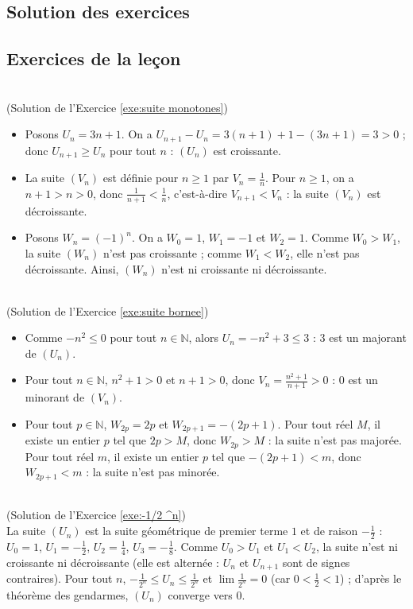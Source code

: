 \begin{corrige}
\section{Solution des exercices}
\subsection*{Exercices de la le\c{c}on}
\begin{sol} ~ \\
\label{Sol:suite monotones}
(Solution de l'Exercice \ref{exe:suite monotones})
\begin{itemize} 
\item Posons $U_n = 3 n + 1 $.
      On a $U_{n+1} - U_n = 3(n+1) + 1 - (3n + 1) = 3 > 0$ ; donc $U_{n+1} \geq U_n$ pour tout $n$ : $(U_n)$ est croissante.
\item La suite $(V_n)$ est d\'efinie pour $n \geq 1$ par $V_n = \frac{1}{n}$.
      Pour $n \geq 1$, on a $n + 1 > n > 0$, donc $\frac{1}{n+1} < \frac{1}{n}$, c'est-\`a-dire $V_{n+1} < V_n$ :
      la suite $(V_n)$ est d\'ecroissante.
\item Posons $W_n = (-1)^n$. On a $W_0 = 1$, $W_1 = -1$ et $W_2 = 1$.
      Comme $W_0 > W_1$, la suite $(W_n)$ n'est pas croissante ; comme $W_1 < W_2$, elle n'est pas d\'ecroissante.
      Ainsi, $(W_n)$ n'est ni croissante ni d\'ecroissante.
\end{itemize}
\end{sol}
%
\begin{sol} ~ \\
(Solution de l'Exercice \ref{exe:suite bornee})
\label{Sol:suite bornee}
\begin{itemize} 
\item Comme $-n^2 \leq 0$ pour tout $n \in \mathbb{N}$, alors $U_n = -n^2 + 3 \leq 3$ : $3$ est un majorant de $(U_n)$.
\item Pour tout $n \in \mathbb{N}$, $n^2 + 1 > 0$ et $n+1 > 0$, donc $V_n = \frac{n^2 + 1}{n+1} > 0$ : $0$ est un minorant de $(V_n)$.
\item Pour tout $p \in \mathbb{N}$, $W_{2p} = 2p$ et $W_{2p+1} = -(2p+1)$.
      Pour tout r\'eel $M$, il existe un entier $p$ tel que $2p > M$, donc $W_{2p} > M$ : la suite n'est pas major\'ee.
      Pour tout r\'eel $m$, il existe un entier $p$ tel que $-(2p+1) < m$, donc $W_{2p+1} < m$ : la suite n'est pas minor\'ee.
\end{itemize}
\end{sol}
%
\begin{sol} ~ \\
\label{sol:-1/2 ^n}
(Solution de l'Exercice \ref{exe:-1/2 ^n})\\
La suite $(U_n)$ est la suite g\'eom\'etrique de premier terme $1$ et de raison $-\frac{1}{2}$ :
$U_0 = 1$, $U_1 = -\frac{1}{2}$, $U_2 = \frac{1}{4}$, $U_3 = -\frac{1}{8}$.
Comme $U_0 > U_1$ et $U_1 < U_2$, la suite n'est ni croissante ni d\'ecroissante (elle est altern\'ee : $U_n$ et $U_{n+1}$ sont de signes contraires).
Pour tout $n$, $-\frac{1}{2^n} \leq U_n \leq \frac{1}{2^n}$ et $\lim \frac{1}{2^n} = 0$ (car $0 < \frac{1}{2} < 1$) ;
d'apr\`es le th\'eor\`eme des gendarmes, $(U_n)$ converge vers $0$.
\end{sol}
%

\end{corrige}
